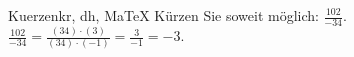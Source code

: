 \begin{MAufgabe}{Kuerzen}{kr, dh, MaTeX}
K\"urzen Sie soweit m\"oglich: $\frac{102}{-34}$.\\ 
\ifLsg\MLoesung
\quad $\frac{102}{-34}=\frac{(34)\cdot(3)}{(34)\cdot(-1)}=\frac{3}{-1}=-3$.\else\relax\fi
 \end{MAufgabe}